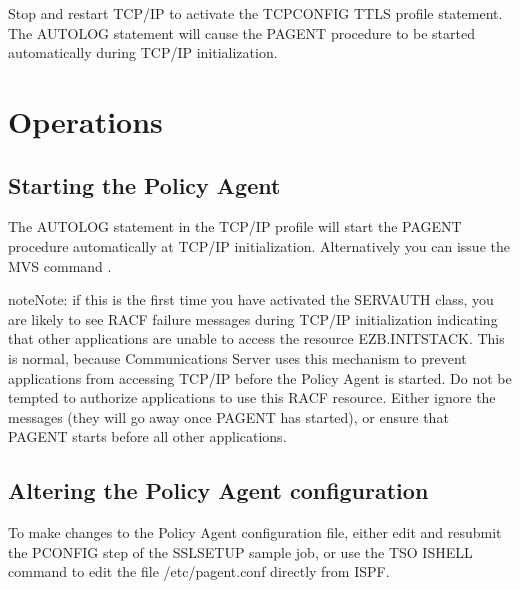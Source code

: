 \documentclass[letterpaper,10pt,english]{sphinxmanual}
\begin{document}
\begin{sphinxVerbatim}[commandchars=\\\{\}]
 
   
\end{sphinxVerbatim}

\sphinxAtStartPar
Stop and restart TCP/IP to activate the TCPCONFIG TTLS profile statement. The AUTOLOG statement will cause the PAGENT procedure to be started automatically during TCP/IP initialization.

\newpage

\ignorespaces 

\section{Operations}
\label{\detokenize{connectivity_guide:operations}}\label{\detokenize{connectivity_guide:index-164}}

\subsection{Starting the Policy Agent}
\label{\detokenize{connectivity_guide:starting-the-policy-agent}}
\sphinxAtStartPar
The AUTOLOG statement in the TCP/IP profile will start the PAGENT procedure automatically at TCP/IP initialization. Alternatively you can issue the MVS command .

\begin{sphinxadmonition}{note}{Note:}
\sphinxAtStartPar
if this is the first time you have activated the SERVAUTH class, you are likely to see RACF failure messages during TCP/IP initialization indicating that other applications are unable to access the resource EZB.INITSTACK. This is normal, because Communications Server uses this mechanism to prevent applications from accessing TCP/IP before the Policy Agent is started. Do not be tempted to authorize applications to use this RACF resource. Either ignore the messages (they will go away once PAGENT has started), or
ensure that PAGENT starts before all other applications.
\end{sphinxadmonition}


\subsection{Altering the Policy Agent configuration}
\label{\detokenize{connectivity_guide:altering-the-policy-agent-configuration}}
\sphinxAtStartPar
To make changes to the Policy Agent configuration file, either edit and resubmit the PCONFIG step of the SSLSETUP sample job, or use the TSO ISHELL command to edit the file /etc/pagent.conf directly from ISPF.
\end{document}
